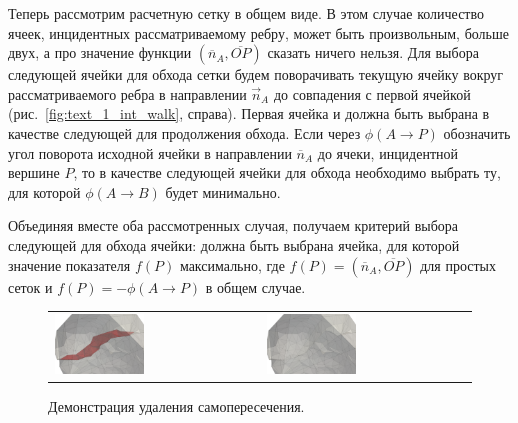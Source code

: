 Теперь рассмотрим расчетную сетку в общем виде.
В этом случае количество ячеек, инцидентных рассматриваемому ребру, может быть произвольным, больше двух, а про значение функции $(\overline{n}_A, \overline{OP})$ сказать ничего нельзя.
Для выбора следующей ячейки для обхода сетки будем поворачивать текущую ячейку вокруг рассматриваемого ребра в направлении $\vec{n}_A$ до совпадения с первой ячейкой (рис.~\ref{fig:text_1_int_walk}, справа).
Первая ячейка и должна быть выбрана в качестве следующей для продолжения обхода.
Если через $\phi(A \rightarrow P)$  обозначить угол поворота исходной ячейки в направлении $\overline{n}_A$ до ячеки, инцидентной вершине $P$, то в качестве следующей ячейки для обхода необходимо выбрать ту, для которой $\phi(A \rightarrow B)$ будет минимально.

Объединяя вместе оба рассмотренных случая, получаем критерий выбора следующей для обхода ячейки: должна быть выбрана ячейка, для которой значение показателя $f(P)$ максимально, где $f(P) = (\overline{n}_A, \overline{OP})$ для простых сеток и $f(P) = -\phi(A \rightarrow P)$ в общем случае.

\begin{figure}[h]
\centering
\begin{tabular}{ll}
\includegraphics[width=0.45\textwidth]{./pics/text_1_int/pic_self_intersection_on.png}
&
\includegraphics[width=0.45\textwidth]{./pics/text_1_int/pic_self_intersection_off.png}
\end{tabular}
\caption{Демонстрация удаления самопересечения.}
\label{fig:text_1_int_selfintoff1}
\end{figure}


